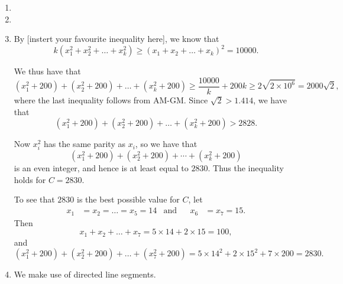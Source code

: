 \documentclass[12pt]{article}
\begin{document}
\begin{enumerate}
\item %


\item %


\item %
By [instert your favourite inequality here], we know that
\[
    k(x_1^2 + x_2^2 + \dots + x_k^2) \geq (x_1 + x_2 + \dots + x_k)^2 = 10000.
\]

We thus have that
\[
    (x_1^2 + 200) + (x_2^2 + 200) + \dots + (x_k^2 + 200) \geq \frac{10000}{k} +
    200k \geq 2 \sqrt{2 \times 10^6} = 2000 \sqrt{2},
\]
where the last inequality follows from AM-GM. Since $\sqrt{2} > 1.414$, we have
that
\[
    (x_1^2 + 200) + (x_2^2 + 200) + \dots + (x_k^2 + 200) > 2828.
\]

Now $x_i^2$ has the same parity as $x_i$, so we have that
\[
    (x_1^2 + 200) + (x_2^2 + 200) + \cdots + (x_k^2 + 200)  
\]
is an even integer, and hence is at least equal to $2830$. Thus the inequality
holds for $C = 2830$.

To see that $2830$ is the best possible value for $C$, let
\begin{align*}
    x_1 & = x_2 = \dots = x_5 = 14 & \text{and} && x_6 & = x_7 = 15.
\end{align*}
Then 
\[
    x_1 + x_2 + \dots + x_7 = 5 \times 14 + 2 \times 15 = 100,
\]
and
\[
    (x_1^2 + 200) + (x_2^2 + 200) + \dots + (x_7^2 + 200) = 5 \times 14^2 + 2
    \times 15^2 + 7 \times 200 = 2830.
\]


\item %
We make use of directed line segments.


\end{enumerate}
\end{document}
